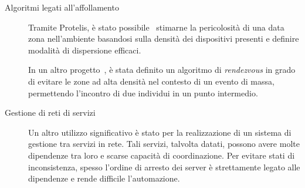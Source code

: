 \begin{description}




  \item[Algoritmi legati all'affollamento]
    Tramite Protelis, è stato possibile~\cite{BV-FOCAS2014} stimarne la pericolosità di una data zona nell'ambiente basandosi sulla densità dei dispositivi presenti e definire modalità di dispersione efficaci.

    In un altro progetto~\cite{ProtelisSAC14}, è stata definito un algoritmo di \emph{rendezvous} in grado di evitare le zone ad alta densità nel contesto di un evento di massa, permettendo l'incontro di due individui in un punto intermedio.

  \item[Gestione di reti di servizi]
    Un altro utilizzo significativo è stato per la realizzazione di un sistema di gestione tra servizi in rete.
    Tali servizi, talvolta datati, possono avere molte dipendenze tra loro e scarse capacità di coordinazione.
    Per evitare stati di inconsistenza, spesso l'ordine di arresto dei server è strettamente legato alle dipendenze e rende difficile l'automazione.


\end{description}
